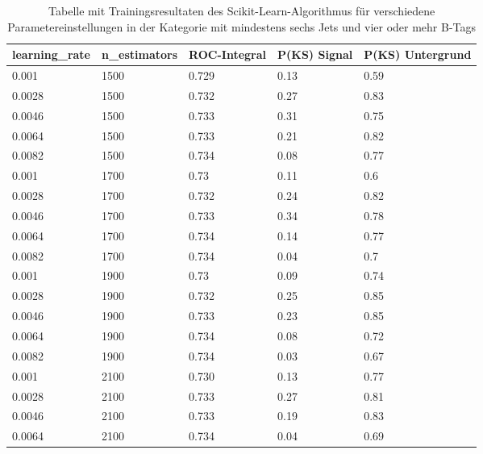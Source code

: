 \begin{table}[hhh]\parbox{12cm}{
\renewcommand\thetable{A.1}
  \caption[Scikit-Learn 6j4t Ergebnisse]{Tabelle mit Trainingsresultaten des Scikit-Learn-Algorithmus f\"ur verschiedene Parametereinstellungen in der Kategorie mit mindestens sechs Jets und vier oder mehr B-Tags}%
  }\label{tab:sklearn_6j4t}
  \begin{center}
  \begin{tabular}{lllll}
  \hline
  learning\_rate & n\_estimators & ROC-Integral & P(KS) Signal & P(KS) Untergrund\\
  \hline
\num{0,001}  & \num{1500} & \num{0,729} & \num{0,13} & \num{0,59}\\
\num{0,0028} & \num{1500} & \num{0,732} & \num{0,27} & \num{0,83}\\
\num{0,0046} & \num{1500} & \num{0,733} & \num{0,31} & \num{0,75}\\
\num{0,0064} & \num{1500} & \num{0,733} & \num{0,21} & \num{0,82}\\
\num{0,0082} & \num{1500} & \num{0,734} & \num{0,08} & \num{0,77}\\
\num{0,001}  & \num{1700} & \num{0,73}  & \num{0,11} & \num{0,6}\\
\num{0,0028} & \num{1700} & \num{0,732} & \num{0,24} & \num{0,82}\\
\num{0,0046} & \num{1700} & \num{0,733} & \num{0,34} & \num{0,78}\\
\num{0,0064} & \num{1700} & \num{0,734} & \num{0,14} & \num{0,77}\\
\num{0,0082} & \num{1700} & \num{0,734} & \num{0,04} & \num{0,7}\\
\num{0,001}  & \num{1900} & \num{0,73}  & \num{0,09} & \num{0,74}\\
\num{0,0028} & \num{1900} & \num{0,732} & \num{0,25} & \num{0,85}\\
\num{0,0046} & \num{1900} & \num{0,733} & \num{0,23} & \num{0,85}\\
\num{0,0064} & \num{1900} & \num{0,734} & \num{0,08} & \num{0,72}\\
\num{0,0082} & \num{1900} & \num{0,734} & \num{0,03} & \num{0,67}\\
\num{0,001}  & \num{2100} & \num{0,730} & \num{0,13} & \num{0,77}\\
\num{0,0028} & \num{2100} & \num{0,733} & \num{0,27} & \num{0,81}\\
\num{0,0046} & \num{2100} & \num{0,733} & \num{0,19} & \num{0,83}\\
\num{0,0064} & \num{2100} & \num{0,734} & \num{0,04} & \num{0,69}\\

\end{tabular}
\end{center}
\end{table}
